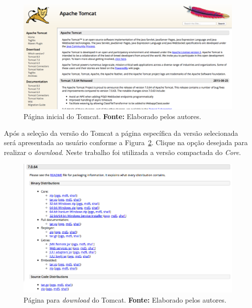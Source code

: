 \newpage
\captionsetup[figure]{list=no}
\begin{figure}[h!]
	\centerline{\includegraphics[scale=0.35]{./imagens/apendices/pagina-inicial-apache-tomcat.png}}
	\caption[Página inicial do Tomcat.]
	{Página inicial do Tomcat. \textbf{Fonte:} Elaborado pelos autores.}
	\label{fig:ap2:pagina_inicial_apache_tomcat}
\end{figure}

Após a seleção da versão do Tomcat a página específica da versão selecionada será apresentada ao usuário conforme a Figura~\ref{fig:ap2:pagina_download_apache_tomcat}. Clique na opção desejada para realizar o \textit{download}. Neste trabalho foi utilizada a versão compactada do \textit{Core}.

\captionsetup[figure]{list=no}
\begin{figure}[h!]
	\centerline{\includegraphics[scale=0.4]{./imagens/apendices/pagina-download-tomcat-7.png}}
	\caption[Página para \textit{download} do Tomcat.]
	{Página para \textit{download} do Tomcat. \textbf{Fonte:} Elaborado pelos autores.}
	\label{fig:ap2:pagina_download_apache_tomcat}
\end{figure}

